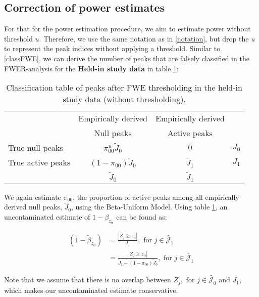 \subsection{Correction of power estimates}

{\color{Cyan}For that for the power estimation procedure, we aim to estimate power without threshold $u$.  Therefore, we use the same notation as in \ref{notation}, but drop the $u$ to represent the peak indices without applying a threshold.  Similar to \ref{classFWE}, we can derive the number of peaks that are falsely classified in the FWER-analysis for the \textbf{Held-in study data} in table \ref{classFWEnothres}:\\

\begin{table}[H]
  \begin{center}
\begin{tabular}{l|cc|l}
  \toprule
  & Empirically derived & Empirically derived \\
  & Null peaks & Active peaks \\
  \midrule
True null peaks & $\pi_{00}^u\tilde{J}_0$ & $0$& $J_0$ \\
  True active peaks & $(1-\pi_{00})\tilde{J}_0$ & $\tilde{J}_1$  & $J_1$ \\
  \midrule
  & $\tilde{J}_0$ & $\tilde{J}_1$ & \\
  \bottomrule
\end{tabular}
\caption{Classification table of peaks after FWE thresholding in the held-in study data (without thresholding). \label{classFWEnothres}}
\end{center}
\end{table}

We again estimate $\pi_00$, the proportion of active peaks among all empirically derived null peaks, $\tilde{J}_0$, using the Beta-Uniform Model.  Using table \ref{classFWEnothres}, an uncontaminated estimate of $1-\beta_{z_\alpha}$ can be found as:

\begin{align}
    (1-\tilde\beta_{z_\alpha}) &= \frac{|Z_j \geq z_\alpha|}{J_1}, \text{ for } j \in \tilde{\mathcal{J}_1} \nonumber \\
                              &= \frac{|Z_j \geq z_\alpha|}{\tilde{J}_1 + (1-\pi_{00})\tilde{J}_0}, \text{ for } j \in \tilde{\mathcal{J}_1} \nonumber
\end{align}

Note that we assume that there is no overlap between $Z_j, \text{ for } j \in \tilde{\mathcal{J}_0}$ and $J_1$, which makes our uncontaminated estimate conservative.}



